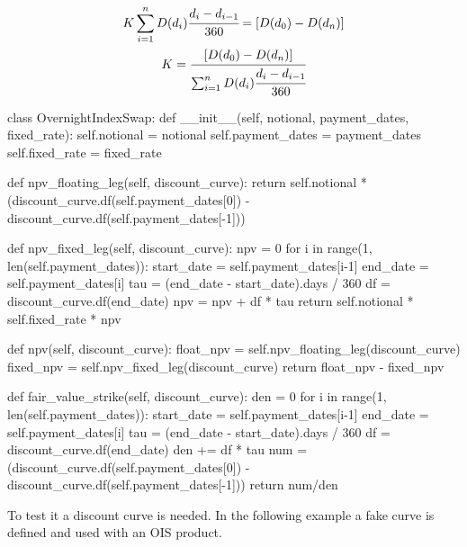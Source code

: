 \begin{equation}
\begin{gathered}
K \sum_{i=1}^{n}D(d_{i})\cfrac{d_i - d_{i-1}}{360} = [D(d_0) - D(d_n)] \\
K = \cfrac{[D(d_0) - D(d_n)]}{\sum_{i=1}^{n}D(d_{i})\cfrac{d_i - d_{i-1}}{360}}
\end{gathered}
\end{equation}

\begin{ipython}
class OvernightIndexSwap:
    def __init__(self, notional, payment_dates, fixed_rate):
        self.notional = notional 
        self.payment_dates = payment_dates
        self.fixed_rate = fixed_rate

    def npv_floating_leg(self, discount_curve):
        return self.notional * (discount_curve.df(self.payment_dates[0]) -
                                discount_curve.df(self.payment_dates[-1]))

    def npv_fixed_leg(self, discount_curve):
        npv = 0
        for i in range(1, len(self.payment_dates)):
            start_date = self.payment_dates[i-1]
            end_date = self.payment_dates[i]
            tau = (end_date - start_date).days / 360
            df = discount_curve.df(end_date)
            npv = npv + df * tau
        return self.notional * self.fixed_rate * npv

    def npv(self, discount_curve):
        float_npv = self.npv_floating_leg(discount_curve)
        fixed_npv = self.npv_fixed_leg(discount_curve)
        return float_npv - fixed_npv

    def fair_value_strike(self, discount_curve):
        den = 0
        for i in range(1, len(self.payment_dates)):
            start_date = self.payment_dates[i-1]
            end_date = self.payment_dates[i]
            tau = (end_date - start_date).days / 360
            df = discount_curve.df(end_date)
            den += df * tau
            num = (discount_curve.df(self.payment_dates[0]) -
                discount_curve.df(self.payment_dates[-1]))
        return num/den
\end{ipython}

To test it a discount curve is needed. In the following example a fake curve is defined and used with an OIS product.

